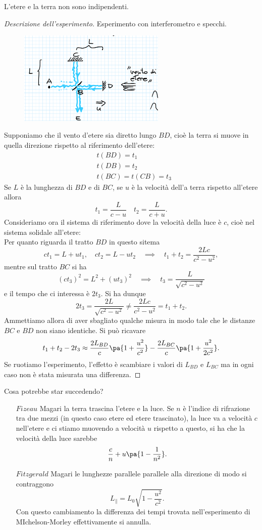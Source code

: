 \begin{fact}
L'etere e la terra non sono indipendenti.
\end{fact}
\begin{proof}[Descrizione dell'esperimento]
Esperimento con interferometro e specchi.
\begin{figure}[!htb]
    \centering
    \includegraphics[width=7cm]{images/Vento_di_Etere.png}
\end{figure}
Supponiamo che il vento d'etere sia diretto lungo $BD$, cio\`e la terra si muove in quella direzione rispetto al riferimento dell'etere:
\begin{align*}
&t(BD)=t_1\\
&t(DB)=t_2\\
&t(BC)=t(CB)=t_3
\end{align*}
Se $L$ \`e la lunghezza di $BD$ e di $BC$, se $u$ \`e la velocit\`a dell'a terra rispetto all'etere allora
\[t_1=\frac L{c-u}\quad t_2=\frac L{c+u}.\]
Consideriamo ora il sistema di riferimento dove la velocit\`a della luce \`e $c$, cio\`e nel sistema solidale all'etere:\\
Per quanto riguarda il tratto $BD$ in questo sitema 
\[ct_1=L+ut_1,\quad ct_2=L-ut_2\quad\implies\quad t_1+t_2=\frac{2Lc}{c^2-u^2},\]
mentre sul tratto $BC$ si ha
\[(ct_3)^2=L^2+(ut_3)^2\quad\implies\quad t_3=\frac L{\sqrt{c^2-u^2}}\]
e il tempo che ci interessa \`e $2t_3$. Si ha dunque
\[2t_3=\frac{2L}{\sqrt{c^2-u^2}}\neq \frac{2Lc}{c^2-u^2}=t_1+t_2.\]
Ammettiamo allora di aver sbagliato qualche misura in modo tale che le distanze $BC$ e $BD$ non siano identiche. Si pu\`o ricavare
\[t_1+t_2-2t_3\approx \frac{2L_{BD}}c\pa{1+\frac{u^2}{c^2}}-\frac{2L_{BC}}c\pa{1+\frac{u^2}{2c^2}}.\]
Se ruotiamo l'esperimento, l'effetto \`e scambiare i valori di $L_{BD}$ e $L_{BC}$ ma in ogni caso non \`e stata misurata una differenza.
\end{proof}
\noindent
Cosa potrebbe star succedendo?
\setlength{\leftmargini}{0cm}
\begin{enumerate}
\item[$\boxed{Fizeau}$] Magari la terra trascina l'etere e la luce. Se $n$ \`e l'indice di rifrazione tra due mezzi (in questo caso etere ed etere trascinato), la luce va a velocit\`a $c$ nell'etere e ci stiamo muovendo a velocit\`a $u$ rispetto a questo, si ha che la velocit\`a della luce sarebbe
\[\frac cn+u\pa{1-\frac1{n^2}}.\]
\item[$\boxed{Fitzgerald}$] Magari le lunghezze parallele parallele alla direzione di modo si contraggono
\[L_{\parallel}=L_0\sqrt{1-\frac{u^2}{c^2}}.\]
Con questo cambiamento la differenza dei tempi trovata nell'esperimento di MIchelson-Morley effettivamente si annulla. 
\end{enumerate}
